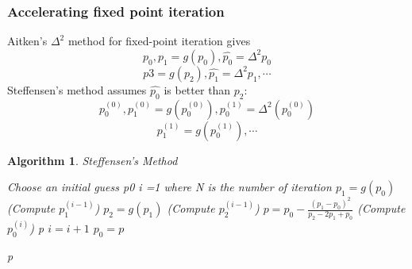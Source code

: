 \documentclass[12pt]{article}
\newtheorem{alg}[theorem]{Algorithm}
\begin{document}
\subsubsection{Accelerating fixed point iteration}
Aitken's $\Delta^2$ method for fixed-point iteration gives $$p_0, p_1 = g(p_0), \hat{p_0} = \Delta^2p_0$$ $$p3 = g(p_2), \hat{p_1} = \Delta^2p_1, \cdots$$
Steffensen's method assumes $\hat{p_0}$ is better than $p_2$: 
$$p_0^{(0)}, p_1^{(0)} = g(p_0^{(0)}), p_0^{(1)} = \Delta^2(p_0^{(0)})$$ $$p_1^{(1)} = g(p_0^{(1)}), \cdots$$
\begin{alg}{Steffensen's Method}
	\begin{algorithmic}
	Choose an initial guess p0
	\State i =1
	 where N is the number of iteration
		\State $p_1 = g(p_0)$ (Compute $p_1^{(i-1)}$)
		\State $p_2 = g(p_1)$ (Compute $p_2^{(i-1)}$)
		\State $p = p_0 - \frac{(p_1 - p_0)^2}{p_2 - 2p_1 + p_0}$ (Compute $p_0^{(i)}$)
			\State \Return p
		\EndIf
		\State $i = i+1$
		\State $p_0 = p$
		
	\EndWhile
	\State \Return p	
	\end{algorithmic}

\end{alg}
\end{document}

